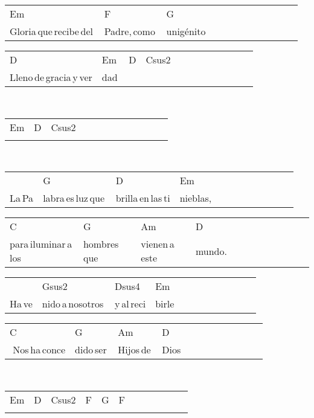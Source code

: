 \begin{multicols}{2}
\begin{minipage}{\columnwidth}
\noindent
\begin{tabular}{llllllllllll}
Em&F&G\\
Gloria\,que\,recibe\,del\,&Padre,\,como\,&unigénito
\end{tabular}

\noindent
\begin{tabular}{llllllllllll}
D&Em&D&Csus2\\
Lleno\,de\,gracia\,y\,ver&dad\quad\,&\,\quad\,&
\end{tabular}
\end{minipage}\\

\noindent
\begin{minipage}{\columnwidth}
\noindent
\noindent
\begin{tabular}{llllllllllll}
Em&D&Csus2\\
\quad\quad\quad\quad&\quad\quad\quad&
\end{tabular}
\end{minipage}\\

\noindent
\begin{minipage}{\columnwidth}
\noindent
\noindent
\begin{tabular}{llllllllllll}
&G&D&Em\\
La\,Pa&labra\,es\,luz\,que\,&brilla\,en\,las\,ti&nieblas,
\end{tabular}

\noindent
\begin{tabular}{llllllllllll}
C&G&Am&D\\
para\,iluminar\,a\,los\,&hombres\,que\,&vienen\,a\,este\,&mundo.
\end{tabular}

\noindent
\begin{tabular}{llllllllllll}
&Gsus2&Dsus4&Em\\
Ha\,ve&nido\,a\,nosotros\,&y\,al\,reci&birle
\end{tabular}

\noindent
\begin{tabular}{llllllllllll}
C&G&Am&D\\
\,\,Nos\,ha\,conce&dido\,ser\,&Hijos\,de\,&Dios
\end{tabular}
\end{minipage}\\


\chorus{}

\noindent
\begin{minipage}{\columnwidth}
\noindent
\noindent
\begin{tabular}{llllllllllll}
Em&D&Csus2&F&G&F\\
\quad\quad\quad&\quad\quad\quad&\quad\quad\quad\quad\quad&\quad\quad\quad\quad&\quad\quad\quad\quad&
\end{tabular}


\end{minipage}
\end{multicols}
